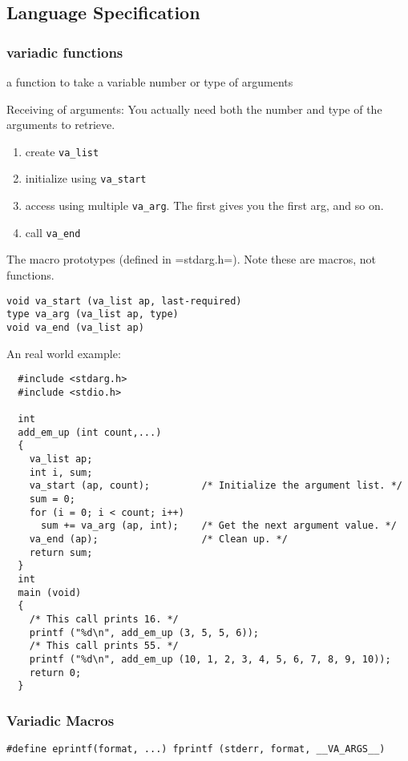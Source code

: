 \subsection{Language Specification}
\subsubsection{variadic functions}
a function to take a variable number or type of arguments

Receiving of arguments:
You actually need both the number and type of the arguments to retrieve.

\begin{enumerate}
\item create \verb$va_list$
\item initialize using \verb$va_start$
\item access using multiple \verb$va_arg$. The first gives you the first arg, and so on.
\item call \verb$va_end$
\end{enumerate}

The macro prototypes (defined in =stdarg.h=). Note these are macros,
not functions.
\begin{lstlisting}
void va_start (va_list ap, last-required)
type va_arg (va_list ap, type)
void va_end (va_list ap)
\end{lstlisting}


An real world example:
\begin{lstlisting}
  #include <stdarg.h>
  #include <stdio.h>

  int
  add_em_up (int count,...)
  {
    va_list ap;
    int i, sum;
    va_start (ap, count);         /* Initialize the argument list. */
    sum = 0;
    for (i = 0; i < count; i++)
      sum += va_arg (ap, int);    /* Get the next argument value. */
    va_end (ap);                  /* Clean up. */
    return sum;
  }
  int
  main (void)
  {
    /* This call prints 16. */
    printf ("%d\n", add_em_up (3, 5, 5, 6));
    /* This call prints 55. */
    printf ("%d\n", add_em_up (10, 1, 2, 3, 4, 5, 6, 7, 8, 9, 10));
    return 0;
  }
\end{lstlisting}

\subsubsection{Variadic Macros}
\begin{lstlisting}
#define eprintf(format, ...) fprintf (stderr, format, __VA_ARGS__)
\end{lstlisting}

